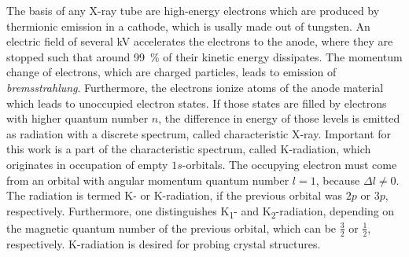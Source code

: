 The basis of any X-ray tube are high-energy electrons which are produced by thermionic emission in a cathode, which is usally made out of tungsten.
An electric field of several \si{\kV} accelerates the electrons to the anode, where they are stopped such that around \qty{99}{\percent} of their kinetic energy dissipates.
The momentum change of electrons, which are charged particles, leads to emission of \textit{bremsstrahlung}.
Furthermore, the electrons ionize atoms of the anode material which leads to unoccupied electron states.
If those states are filled by electrons with higher quantum number $n$, the difference in energy of those levels is emitted as radiation with a discrete spectrum, called characteristic X-ray.
Important for this work is a part of the characteristic spectrum, called K-radiation, which originates in occupation of empty $1s$-orbitals.
The occupying electron must come from an orbital with angular momentum quantum number $l=1$, because $\Delta l\neq0$.
The radiation is termed K\textalpha- or K\textbeta-radiation, if the previous orbital was $2p$ or $3p$, respectively.
Furthermore, one distinguishes K\textalpha\textsubscript{1}- and K\textalpha\textsubscript{2}-radiation, depending on the magnetic quantum number of the previous orbital, which can be $\frac{3}{2}$ or $\frac{1}{2}$, respectively.
K\textalpha-radiation is desired for probing crystal structures.